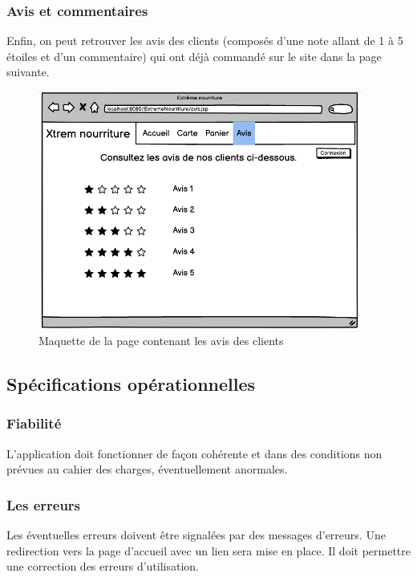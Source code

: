 \subsubsection{Avis et commentaires}
Enfin, on peut retrouver les avis des clients (composés d'une note allant de 1 à 5 étoiles et d'un commentaire) qui ont déjà commandé sur le site dans la page suivante.
\begin{figure}[H]
\begin{centering}
\includegraphics[width=0.95\textwidth,height=0.6\textheight]{images/avis.png}
\caption{Maquette de la page contenant les avis des clients}
\par
\end{centering}
\end{figure}

\clearpage

\subsection{Spécifications opérationnelles}
\subsubsection{Fiabilité}
L’application doit fonctionner de façon cohérente et dans des conditions non prévues au cahier des charges, éventuellement anormales.

\subsubsection{Les erreurs}
Les éventuelles erreurs doivent être signalées par des messages d’erreurs. Une redirection vers la page d'accueil avec un lien sera mise en place. Il doit permettre une correction des erreurs d'utilisation.

